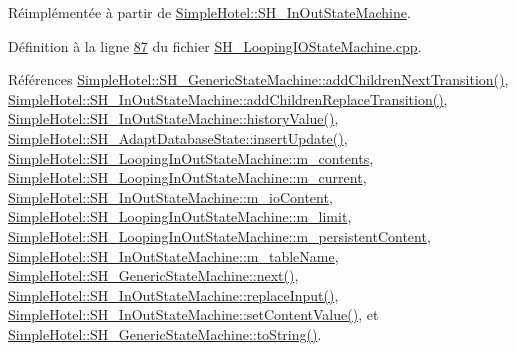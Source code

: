 Réimplémentée à partir de \hyperlink{classSimpleHotel_1_1SH__InOutStateMachine_aaf5afe04d6e4d3d5ebf0b5f1b00eddf1}{Simple\-Hotel\-::\-S\-H\-\_\-\-In\-Out\-State\-Machine}.



Définition à la ligne \hyperlink{SH__LoopingIOStateMachine_8cpp_source_l00087}{87} du fichier \hyperlink{SH__LoopingIOStateMachine_8cpp_source}{S\-H\-\_\-\-Looping\-I\-O\-State\-Machine.\-cpp}.



Références \hyperlink{classSimpleHotel_1_1SH__GenericStateMachine_a3771c91002bec6ab9414703251cc7825}{Simple\-Hotel\-::\-S\-H\-\_\-\-Generic\-State\-Machine\-::add\-Children\-Next\-Transition()}, \hyperlink{classSimpleHotel_1_1SH__InOutStateMachine_a3339fd43658e6ac0979bd43014785766}{Simple\-Hotel\-::\-S\-H\-\_\-\-In\-Out\-State\-Machine\-::add\-Children\-Replace\-Transition()}, \hyperlink{classSimpleHotel_1_1SH__InOutStateMachine_af9de98943b9428ed4144bc6695c1ada0}{Simple\-Hotel\-::\-S\-H\-\_\-\-In\-Out\-State\-Machine\-::history\-Value()}, \hyperlink{classSimpleHotel_1_1SH__AdaptDatabaseState_af125e11b83df08b8e67f90c55c69d583}{Simple\-Hotel\-::\-S\-H\-\_\-\-Adapt\-Database\-State\-::insert\-Update()}, \hyperlink{classSimpleHotel_1_1SH__LoopingInOutStateMachine_a46c3dab932ceedeef821a25fa8d6e5dd}{Simple\-Hotel\-::\-S\-H\-\_\-\-Looping\-In\-Out\-State\-Machine\-::m\-\_\-contents}, \hyperlink{classSimpleHotel_1_1SH__LoopingInOutStateMachine_a700a3c54ef593c94815a0418d83dd381}{Simple\-Hotel\-::\-S\-H\-\_\-\-Looping\-In\-Out\-State\-Machine\-::m\-\_\-current}, \hyperlink{classSimpleHotel_1_1SH__InOutStateMachine_a4b0a3a48b0da31fddb724a357ad9b52c}{Simple\-Hotel\-::\-S\-H\-\_\-\-In\-Out\-State\-Machine\-::m\-\_\-io\-Content}, \hyperlink{classSimpleHotel_1_1SH__LoopingInOutStateMachine_ae5e496343aed89d7062e2478218f4e7d}{Simple\-Hotel\-::\-S\-H\-\_\-\-Looping\-In\-Out\-State\-Machine\-::m\-\_\-limit}, \hyperlink{classSimpleHotel_1_1SH__LoopingInOutStateMachine_a6ed5f5c62373711ce123fb1a97fc3387}{Simple\-Hotel\-::\-S\-H\-\_\-\-Looping\-In\-Out\-State\-Machine\-::m\-\_\-persistent\-Content}, \hyperlink{classSimpleHotel_1_1SH__InOutStateMachine_a15c063debdaa4c87bd4925867a13ce9e}{Simple\-Hotel\-::\-S\-H\-\_\-\-In\-Out\-State\-Machine\-::m\-\_\-table\-Name}, \hyperlink{classSimpleHotel_1_1SH__GenericStateMachine_a2de14d4920ae8c10b70c2d73fc2d4a93}{Simple\-Hotel\-::\-S\-H\-\_\-\-Generic\-State\-Machine\-::next()}, \hyperlink{classSimpleHotel_1_1SH__InOutStateMachine_a9117d781c5f8bc02d8b2eba359b0e85a}{Simple\-Hotel\-::\-S\-H\-\_\-\-In\-Out\-State\-Machine\-::replace\-Input()}, \hyperlink{classSimpleHotel_1_1SH__InOutStateMachine_aaf92da452f6cf7cc57aa9e60f88322e4}{Simple\-Hotel\-::\-S\-H\-\_\-\-In\-Out\-State\-Machine\-::set\-Content\-Value()}, et \hyperlink{classSimpleHotel_1_1SH__GenericStateMachine_ad6dd1d0986c40684410ed94f1f610b12}{Simple\-Hotel\-::\-S\-H\-\_\-\-Generic\-State\-Machine\-::to\-String()}.



